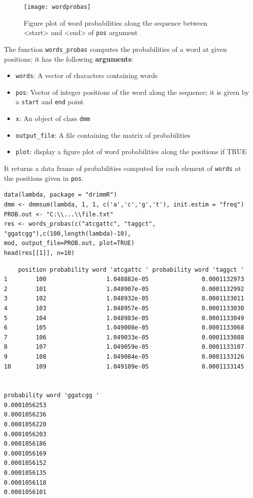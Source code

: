 \documentclass[article,nojss]{jss}\usepackage[]{graphicx}\usepackage[]{color}
\begin{document}
\begin{figure}[htbp]
\centering
\texttt{[image: wordprobas]}
\caption{Figure plot of word probabilities along the sequence between <start> and <end> of {\tt pos} argument} \label{wordprobas}
\end{figure}

\clearpage

The function \verb|words_probas| computes the probabilities of a word at given positions; it has the following {\bf arguments}:
%
\begin{itemize}
\item {\tt words}: A vector of characters containing words
\item {\tt pos}: Vector of integer positions of the word along the sequence; it is given by a {\tt start} and {\tt end} point
\item {\tt x}: An object of class {\tt dmm}
\item {\tt output\_file}: A file containing the matrix of probabilities
\item {\tt plot}: display a figure plot of word probabilities along the positions if TRUE
\end{itemize}
%
It returns a data frame of probabilities computed for each element of {\tt words} at the positions given in {\tt pos}. \\


\begin{lstlisting}
data(lambda, package = "drimmR")
dmm <- dmmsum(lambda, 1, 1, c('a','c','g','t'), init.estim = "freq")
PROB.out <- "C:\\...\\file.txt"
res <- words_probas(c("atcgattc", "taggct", "ggatcgg"),c(100,length(lambda)-10),
mod, output_file=PROB.out, plot=TRUE)
head(res[[1]], n=10)
\end{lstlisting}


\begin{lstlisting}
    position probability word 'atcgattc ' probability word 'taggct '
1        100                 1.048882e-05               0.0001132973
2        101                 1.048907e-05               0.0001132992
3        102                 1.048932e-05               0.0001133011
4        103                 1.048957e-05               0.0001133030
5        104                 1.048983e-05               0.0001133049
6        105                 1.049008e-05               0.0001133068
7        106                 1.049033e-05               0.0001133088
8        107                 1.049059e-05               0.0001133107
9        108                 1.049084e-05               0.0001133126
10       109                 1.049109e-05               0.0001133145


probability word 'ggatcgg '
0.0001056253
0.0001056236
0.0001056220
0.0001056203
0.0001056186
0.0001056169
0.0001056152
0.0001056135
0.0001056118
0.0001056101
\end{lstlisting}
\end{document}
